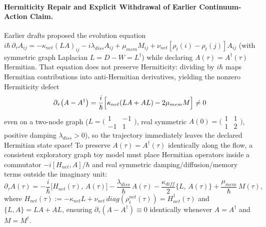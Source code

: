 \documentclass[american,11pt,letterpaper]{article}
\def\mathrm#1{#1}%
\def\emph#1{#1}%
\begin{document}
\paragraph{Hermiticity Repair and Explicit Withdrawal of Earlier Continuum-Action Claim.}
Earlier drafts proposed the evolution equation $i\hbar\,\partial_\tau A_{ij} = -\kappa_{\mathrm{net}}(LA)_{ij} - i\lambda_{\mathrm{diss}}A_{ij} + \mu_{\mathrm{mem}}M_{ij} + \nu_{\mathrm{net}}[\rho_t(i)-\rho_t(j)]A_{ij}$ (with symmetric graph Laplacian $L = D - W = L^\dagger$) while declaring $A(\tau) = A^\dagger(\tau)$ Hermitian. That equation does \emph{not} preserve Hermiticity: dividing by $i\hbar$ maps Hermitian contributions into anti-Hermitian derivatives, yielding the nonzero Hermiticity defect
\begin{equation}
\partial_\tau\bigl(A - A^\dagger\bigr) = \frac{i}{\hbar}\Bigl[\kappa_{\mathrm{net}}(LA + AL) - 2\mu_{\mathrm{mem}} M\Bigr] \ne 0
\label{eq:network_hermiticity_defect}
\end{equation}
even on a two-node graph ($L = \bigl(\begin{smallmatrix}1 & -1\\ -1 & 1\end{smallmatrix}\bigr)$, real symmetric $A(0) = \bigl(\begin{smallmatrix}1 & 1\\ 1 & 2\end{smallmatrix}\bigr)$, positive damping $\lambda_{\mathrm{diss}} > 0$), so the trajectory immediately leaves the declared Hermitian state space! To preserve $A(\tau) = A^\dagger(\tau)$ identically along the flow, a consistent exploratory graph toy model must place Hermitian operators inside a commutator $-i[H_{\mathrm{net}}, A]/\hbar$ and real symmetric damping/diffusion/memory terms outside the imaginary unit:
\begin{equation}
\partial_\tau A(\tau)
= -\frac{i}{\hbar}\bigl[H_{\mathrm{net}}(\tau),\, A(\tau)\bigr]
  - \frac{\lambda_{\mathrm{diss}}}{\hbar}\,A(\tau)
  - \frac{\kappa_{\mathrm{diff}}}{2}\bigl\{L,\, A(\tau)\bigr\}
  + \frac{\mu_{\mathrm{mem}}}{\hbar}\,M(\tau),
\label{eq:discrete_super_coherence}
\end{equation}
where $H_{\mathrm{net}}(\tau) := -\kappa_{\mathrm{net}} L + \nu_{\mathrm{net}}\,\mathrm{diag}(\rho_t^{\mathrm{net}}(\tau)) = H_{\mathrm{net}}^\dagger(\tau)$ and $\{L, A\} = LA + AL$, ensuring $\partial_\tau(A - A^\dagger) \equiv 0$ identically whenever $A = A^\dagger$ and $M = M^\dagger$.
\end{document}
